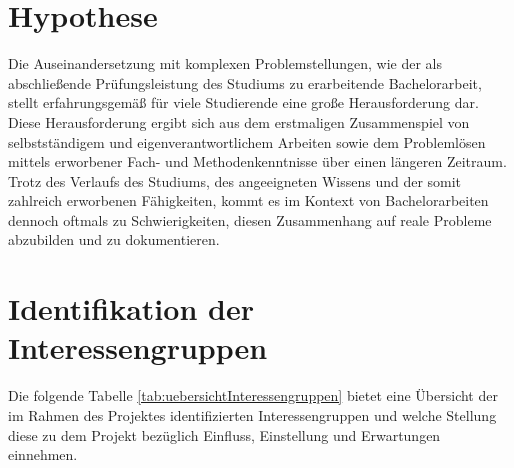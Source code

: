 \documentclass[bibliography=totoc,listof=totoc,BCOR=5mm,DIV=12,oneside]{scrbook}
\begin{document}
\section{Hypothese}
\par Die Auseinandersetzung mit komplexen Problemstellungen, wie der als abschließende Prüfungsleistung des Studiums zu erarbeitende Bachelorarbeit, stellt erfahrungsgemäß für viele Studierende eine große Herausforderung dar. Diese Herausforderung ergibt sich aus dem erstmaligen Zusammenspiel von selbstständigem und eigenverantwortlichem Arbeiten sowie dem Problemlösen mittels erworbener Fach- und Methodenkenntnisse über einen längeren Zeitraum.
Trotz des Verlaufs des Studiums, des angeeigneten Wissens und der somit zahlreich erworbenen Fähigkeiten, kommt es im Kontext von Bachelorarbeiten dennoch oftmals zu Schwierigkeiten, diesen Zusammenhang auf reale Probleme abzubilden und zu dokumentieren.

\newpage
\section{Identifikation der Interessengruppen}
\par Die folgende Tabelle \ref{tab:uebersichtInteressengruppen} bietet eine Übersicht der im Rahmen des Projektes identifizierten Interessengruppen und welche Stellung diese zu dem Projekt bezüglich Einfluss, Einstellung und Erwartungen einnehmen.
\end{document}

